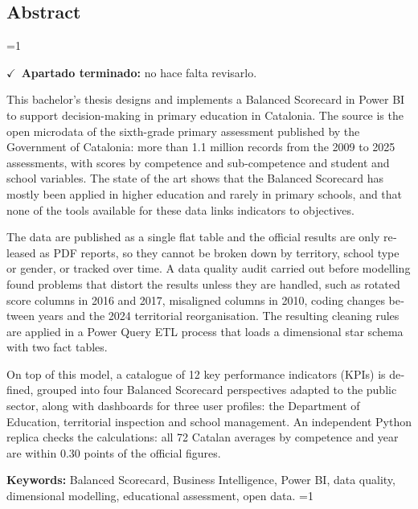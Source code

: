 \documentclass[12pt, a4paper, oneside]{report}
\newcommand{\mostrarterminados}{1}
\newenvironment{revisado}
  {\ifnum\mostrarterminados=1\relax\begin{cajarevisada}\noindent\colorbox{verdeterminado}{\parbox{\dimexpr\linewidth-2\fboxsep\relax}{\small$\checkmark$\ \textbf{Apartado terminado:} no hace falta revisarlo.}}\par\medskip\fi}
  {\ifnum\mostrarterminados=1\relax\end{cajarevisada}\fi}
\begin{document}
\begin{otherlanguage}{english}
\chapter*{Abstract}
\begin{revisado}
This bachelor's thesis designs and implements a Balanced Scorecard in Power BI to support decision-making in primary education in Catalonia. The source is the open microdata of the sixth-grade primary assessment published by the Government of Catalonia: more than 1.1 million records from the 2009 to 2025 assessments, with scores by competence and sub-competence and student and school variables. The state of the art shows that the Balanced Scorecard has mostly been applied in higher education and rarely in primary schools, and that none of the tools available for these data links indicators to objectives.

The data are published as a single flat table and the official results are only released as PDF reports, so they cannot be broken down by territory, school type or gender, or tracked over time. A data quality audit carried out before modelling found problems that distort the results unless they are handled, such as rotated score columns in 2016 and 2017, misaligned columns in 2010, coding changes between years and the 2024 territorial reorganisation. The resulting cleaning rules are applied in a Power Query ETL process that loads a dimensional star schema with two fact tables.

On top of this model, a catalogue of 12 key performance indicators (KPIs) is defined, grouped into four Balanced Scorecard perspectives adapted to the public sector, along with dashboards for three user profiles: the Department of Education, territorial inspection and school management. An independent Python replica checks the calculations: all 72 Catalan averages by competence and year are within 0.30 points of the official figures.

\vspace{0.5cm}
\noindent\textbf{Keywords:} Balanced Scorecard, Business Intelligence, Power BI, data quality, dimensional modelling, educational assessment, open data.
\end{revisado}
\end{otherlanguage}


\tableofcontents
\listoftables
\listoffigures
\end{document}
